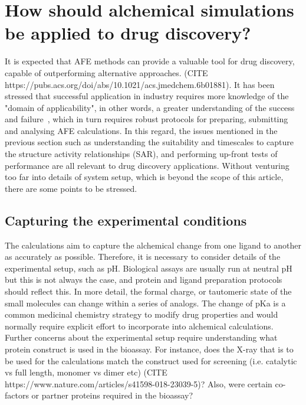 \documentclass[9pt,bestpractices]{livecoms}
\begin{document}
\section{How should alchemical simulations be applied to drug discovery?}

It is expected that AFE methods can provide a valuable tool for drug discovery, capable of outperforming alternative approaches. (CITE https://pubs.acs.org/doi/abs/10.1021/acs.jmedchem.6b01881). It has been stressed that successful application in industry requires more knowledge of the "domain of applicability", in other words, a greater understanding of the success and failure~\cite{sherborne2016collaborating}, which in turn requires robust protocols for preparing, submitting and analysing AFE calculations. In this regard, the issues mentioned in the previous section such as understanding the suitability and timescales to capture the structure activity relationships (SAR), and performing up-front tests of performance are all relevant to drug discovery applications. Without venturing too far into details of system setup, which is beyond the scope of this article, there are some points to be stressed. 
\subsection{Capturing the experimental conditions}
The calculations aim to capture the alchemical change from one ligand to another as accurately as possible. Therefore, it is necessary to consider details of the experimental setup, such as pH. Biological assays are usually run at neutral pH but this is not always the case, and protein and ligand preparation protocols should reflect this. In more detail, the formal charge, or tautomeric state of the small molecules can change within a series of analogs. The change of pKa is a common medicinal chemistry strategy to modify drug properties and would normally require explicit effort to incorporate into alchemical calculations. Further concerns about the experimental setup require understanding what protein construct is used in the bioassay. For instance, does the X-ray that is to be used for the calculations match the construct used for screening (i.e. catalytic vs full length, monomer vs dimer etc) (CITE https://www.nature.com/articles/s41598-018-23039-5)? Also, were certain co-factors or partner proteins required in the bioassay? 
%
\end{document}

